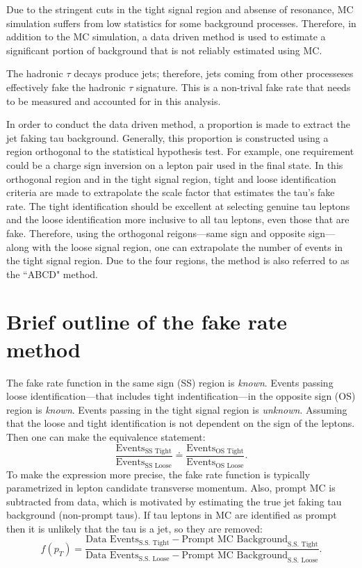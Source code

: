 
Due to the stringent cuts in the tight signal region and absense of resonance, MC simulation suffers from low statistics for some background processes.  
Therefore, in addition to the MC simulation, a data driven method is used to estimate a significant portion of background that is not reliably estimated using MC.

The hadronic $\tau$ decays produce jets; therefore, jets coming from other processeses effectively fake the hadronic $\tau$ signature. This is a non-trival fake rate that needs to be measured and accounted for in this analysis. 

In order to conduct the data driven method, a proportion is made to extract the jet faking tau background. Generally, this proportion is constructed using a region orthogonal to the statistical hypothesis test. For example, one requirement could be a charge sign inversion on a lepton pair used in the final state. In this orthogonal region and in the tight signal region, tight and loose identification criteria are made to extrapolate the scale factor that estimates the tau's fake rate. 
The tight identification should be excellent at selecting genuine tau leptons and the loose identification more inclusive to all tau leptons, even those that are fake. 
Therefore, using the orthogonal reigons---same sign and opposite sign---along with the loose signal region, one can extrapolate the number of events in the tight signal region. Due to the four regions, the method is also referred to as the ``ABCD" method. 


\section{Brief outline of the fake rate method}
The fake rate function in the same sign (SS) region is \textit{known}.
Events passing loose identification---that includes tight indentification---in the opposite sign (OS) region is \textit{known}.
Events passing in the tight signal region is \textit{unknown}. 
Assuming that the loose and tight identification is not dependent on the sign of the leptons. Then one can make the equivalence statement: 
\begin{equation}
\label{eq:abcd}
\frac{\text{Events}_\text{SS Tight}}{\text{Events}_\text{SS Loose}} \doteq \frac{\text{Events}_\text{OS Tight}}{\text{Events}_\text{OS Loose}}
\text{.}
\end{equation}
To make the expression more precise, the fake rate function is typically parametrized in lepton candidate transverse momentum. 
 Also, prompt MC is subtracted from data, which is motivated by estimating the true jet faking tau background (non-prompt taus). If tau leptons in MC are identified as prompt then it is unlikely that the tau is a jet, so they are removed: 
\begin{equation}
f(p_T)=\frac{\text{Data Events}_\text{S.S. Tight} - \text{Prompt MC Background}_\text{S.S. Tight}}{{\text{Data Events}_\text{S.S. Loose} - \text{Prompt MC Background}_\text{S.S. Loose}}}
\text{.}
\end{equation} 

